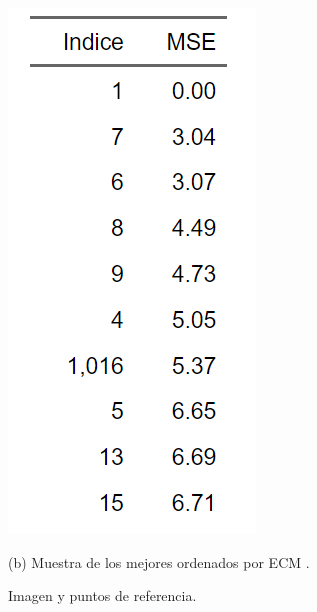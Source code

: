 \documentclass[11pt, letterpaper]{article}
\begin{document}
\begin{figure}[h!]
\begin{minipage}{0.25\textwidth}
		\includegraphics[width=\textwidth]{IMG/R4.1.png}
		\caption*{(b) Muestra de los mejores ordenados por ECM .}
	\end{minipage}
	\caption{Imagen y puntos de referencia.}
	\label{fig:f4}
\end{figure}
\end{document}
